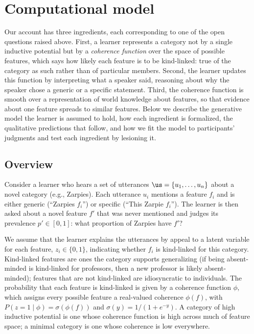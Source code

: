 
\section{Computational model}

Our account has three ingredients, each corresponding to one of the open
questions raised above. First, a learner represents a category not by a single
inductive potential but by a \emph{coherence function} over the space of
possible features, which says how likely each feature is to be kind-linked: true
of the category as such rather than of particular members. Second, the learner
updates this function by interpreting what a speaker said, reasoning about why
the speaker chose a generic or a specific statement. Third, the coherence
function is smooth over a representation of world knowledge about features, so
that evidence about one feature spreads to similar features. Below we describe
the generative model the learner is assumed to hold, how each ingredient is
formalized, the qualitative predictions that follow, and how we fit the model to
participants' judgments and test each ingredient by lesioning it.

\subsection{Overview}

Consider a learner who hears a set of utterances $\us = \{u_1, \ldots, u_n\}$
about a novel category (e.g., Zarpies). Each utterance $u_i$ mentions a feature
$f_i$ and is either generic (``Zarpies $f_i$'') or specific (``This Zarpie
$f_i$''). The learner is then asked about a novel feature $f'$ that was never
mentioned and judges its prevalence $p' \in [0, 1]$: what proportion of Zarpies
have $f'$?

We assume that the learner explains the utterances by appeal to a latent
variable for each feature, $z_i \in \{0, 1\}$, indicating whether $f_i$ is
kind-linked for this category. Kind-linked features are ones the category
supports generalizing (if being absent-minded is kind-linked for professors,
then a new professor is likely absent-minded); features that are not kind-linked
are idiosyncratic to individuals. The probability that each feature is
kind-linked is given by a coherence function $\phi$, which assigns every
possible feature a real-valued coherence $\phi(f)$, with
$P(z = 1 \mid \phi) = \sigma(\phi(f))$ and $\sigma(y) = 1/(1 + e^{-y})$. A
category of high inductive potential is one whose coherence function is high
across much of feature space; a minimal category is one whose coherence is low
everywhere.

